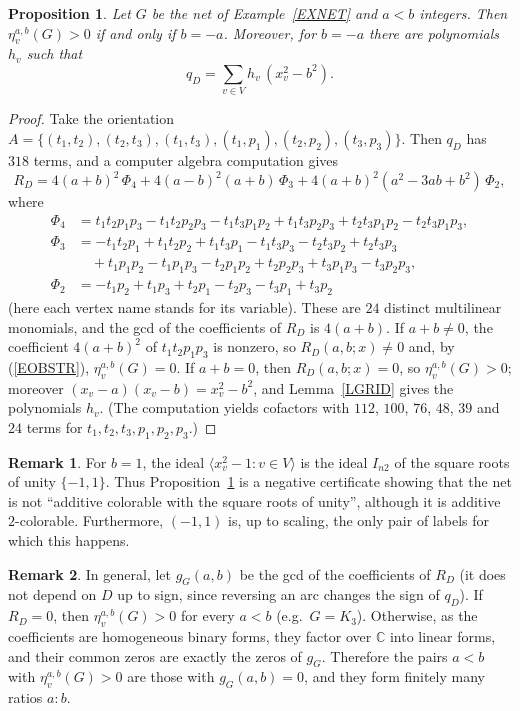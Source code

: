 \documentclass[a4paper,11pt]{article}
\newcommand{\etav}{\eta_v^{a,b}}
\newtheorem{prop}{Proposition}
\theoremstyle{definition}
\newtheorem{rem}{Remark}
\begin{document}
\begin{prop} \label{PNET}
Let $G$ be the net of Example~\ref{EXNET} and $a < b$ integers. Then $\etav(G) > 0$ if and only if $b = -a$. Moreover, for $b = -a$
there are polynomials $h_v$ such that
$$q_D = \sum_{v \in V} h_v\,(x_v^2 - b^2).$$
\end{prop}
\begin{proof}
Take the orientation $A = \{ (t_1,t_2), (t_2,t_3), (t_1,t_3), (t_1,p_1), (t_2,p_2), (t_3,p_3) \}$. Then $q_D$ has $318$ terms, and a
computer algebra computation gives
$$R_D = 4(a+b)^2\,\Phi_4 + 4(a-b)^2(a+b)\,\Phi_3 + 4(a+b)^2(a^2 - 3ab + b^2)\,\Phi_2,$$
where
\begin{align*}
\Phi_4 &= t_1t_2p_1p_3 - t_1t_2p_2p_3 - t_1t_3p_1p_2 + t_1t_3p_2p_3 + t_2t_3p_1p_2 - t_2t_3p_1p_3,\\
\Phi_3 &= -t_1t_2p_1 + t_1t_2p_2 + t_1t_3p_1 - t_1t_3p_3 - t_2t_3p_2 + t_2t_3p_3 \\
       &\quad + t_1p_1p_2 - t_1p_1p_3 - t_2p_1p_2 + t_2p_2p_3 + t_3p_1p_3 - t_3p_2p_3,\\
\Phi_2 &= -t_1p_2 + t_1p_3 + t_2p_1 - t_2p_3 - t_3p_1 + t_3p_2
\end{align*}
(here each vertex name stands for its variable). These are $24$ distinct multilinear monomials, and the gcd of the coefficients of
$R_D$ is $4(a+b)$.
If $a + b \neq 0$, the coefficient $4(a+b)^2$ of $t_1t_2p_1p_3$ is nonzero, so $R_D(a,b;x) \neq 0$ and, by (\ref{EOBSTR}),
$\etav(G) = 0$. If $a + b = 0$, then $R_D(a,b;x) = 0$, so $\etav(G) > 0$; moreover $(x_v - a)(x_v - b) = x_v^2 - b^2$, and
Lemma~\ref{LGRID} gives the polynomials $h_v$. (The computation yields cofactors with $112$, $100$, $76$, $48$, $39$ and $24$
terms for $t_1, t_2, t_3, p_1, p_2, p_3$.)
\end{proof}

\begin{rem}
For $b = 1$, the ideal $\langle x_v^2 - 1 : v \in V \rangle$ is the ideal $I_{n2}$ of the square roots of unity $\{-1, 1\}$. Thus
Proposition~\ref{PNET} is a negative certificate showing that the net is not ``additive colorable with the square roots of
unity'', although it is additive $2$-colorable. Furthermore, $(-1,1)$ is, up to scaling, the only pair of labels for which this
happens.
\end{rem}

\begin{rem}
In general, let $g_G(a,b)$ be the gcd of the coefficients of $R_D$ (it does not depend on $D$ up to sign, since reversing an arc
changes the sign of $q_D$). If $R_D = 0$, then $\etav(G) > 0$ for every $a < b$ (e.g.~$G = K_3$). Otherwise, as the coefficients
are homogeneous binary forms, they factor over $\mathbb{C}$ into linear forms, and their common zeros are exactly the zeros of
$g_G$. Therefore the pairs $a < b$ with $\etav(G) > 0$ are those with $g_G(a,b) = 0$, and they form finitely many ratios $a : b$.
\end{rem}
\end{document}
